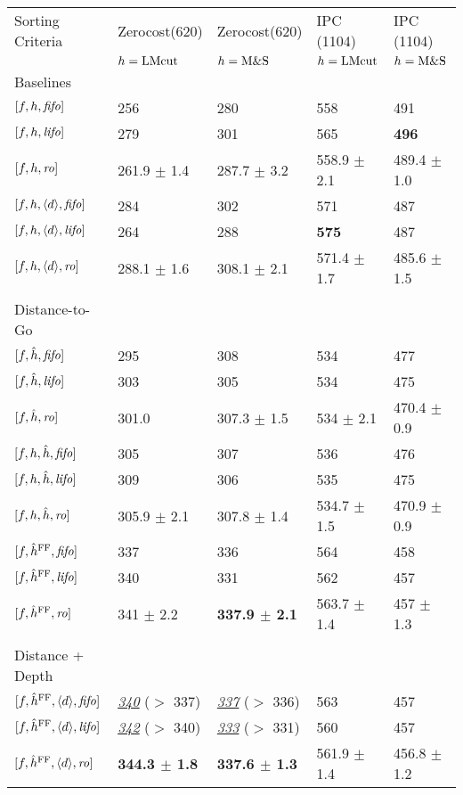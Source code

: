 \begin{center}
\begin{tabular}{|l|ll|ll|}
Sorting Criteria & Zerocost(620) & Zerocost(620) & IPC (1104) & IPC (1104)\\
 & \(h=\text{LMcut}\) & \(h=\text{M\&S}\) & \(h=\text{LMcut}\) & \(h=\text{M\&S}\)\\
Baselines &  &  &  & \\
\([f,h,{\text{\textit{fifo}}}]\) & 256 & 280 & 558 & 491\\
\([f,h,{\text{\textit{lifo}}}]\) & 279 & 301 & 565 & \textbf{496}\\
\([f,h,{\text{\textit{ro}}}]\) & 261.9 \(\pm\) 1.4 & 287.7 \(\pm\) 3.2 & 558.9 \(\pm\) 2.1 & 489.4 \(\pm\) 1.0\\
\([f,h,{\left<d\right>},{\text{\textit{fifo}}}]\) & 284 & 302 & 571 & 487\\
\([f,h,{\left<d\right>},{\text{\textit{lifo}}}]\) & 264 & 288 & \textbf{575} & 487\\
\([f,h,{\left<d\right>},{\text{\textit{ro}}}]\) & 288.1 \(\pm\) 1.6 & 308.1 \(\pm\) 2.1 & 571.4 \(\pm\) 1.7 & 485.6 \(\pm\) 1.5\\
 &  &  &  & \\
Distance-to-Go &  &  &  & \\
\([f,\hat{h},{\text{\textit{fifo}}}]\) & 295 & 308 & 534 & 477\\
\([f,\hat{h},{\text{\textit{lifo}}}]\) & 303 & 305 & 534 & 475\\
\([f,\hat{h},{\text{\textit{ro}}}]\) & 301.0 & 307.3 \(\pm\) 1.5 & 534 \(\pm\) 2.1 & 470.4 \(\pm\) 0.9\\
\([f,h,\hat{h},{\text{\textit{fifo}}}]\) & 305 & 307 & 536 & 476\\
\([f,h,\hat{h},{\text{\textit{lifo}}}]\) & 309 & 306 & 535 & 475\\
\([f,h,\hat{h},{\text{\textit{ro}}}]\) & 305.9 \(\pm\) 2.1 & 307.8 \(\pm\) 1.4 & 534.7 \(\pm\) 1.5 & 470.9 \(\pm\) 0.9\\
\([f,\hat{h}^{\text{FF}},{\text{\textit{fifo}}}]\) & 337 & 336 & 564 & 458\\
\([f,\hat{h}^{\text{FF}},{\text{\textit{lifo}}}]\) & 340 & 331 & 562 & 457\\
\([f,\hat{h}^{\text{FF}},{\text{\textit{ro}}}]\) & 341 \(\pm\) 2.2 & \textbf{337.9 \(\pm\) 2.1} & 563.7 \(\pm\) 1.4 & 457 \(\pm\) 1.3\\
 &  &  &  & \\
Distance + Depth &  &  &  & \\
\([f,\hat{h}^{\text{FF}},{\left<d\right>},{\text{\textit{fifo}}}]\) & \uline{\emph{340}} (\(>\) 337) & \uline{\emph{337}} (\(>\) 336) & 563 & 457\\
\([f,\hat{h}^{\text{FF}},{\left<d\right>},{\text{\textit{lifo}}}]\) & \uline{\emph{342}} (\(>\) 340) & \uline{\emph{333}} (\(>\) 331) & 560 & 457\\
\([f,\hat{h}^{\text{FF}},{\left<d\right>},{\text{\textit{ro}}}]\) & \textbf{344.3 \(\pm\) 1.8} & \textbf{337.6 \(\pm\) 1.3} & 561.9 \(\pm\) 1.4 & 456.8 \(\pm\) 1.2\\
\end{tabular}
\end{center}
